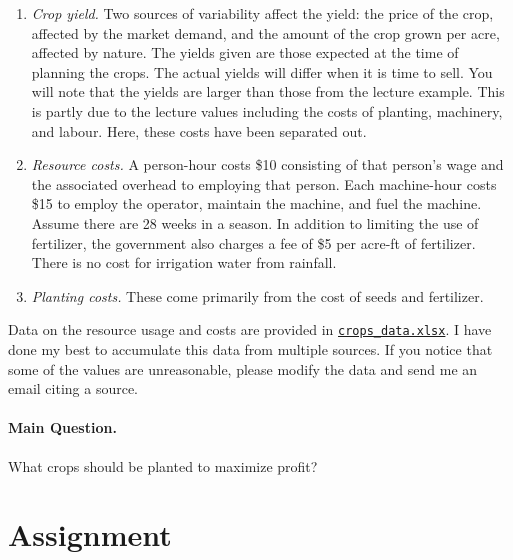 \documentclass[letter]{article}
\begin{document}
\begin{enumerate}	
	
	\item \textit{Crop yield.} Two sources of variability affect the yield: the price of the crop, affected by the market demand, and the amount of the crop grown per acre, affected by nature. The yields given are those expected at the time of planning the crops. The actual yields will differ when it is time to sell. You will note that the yields are larger than those from the lecture example. This is partly due to the lecture values including the costs of planting, machinery, and labour. Here, these costs have been separated out.
	
	\item \textit{Resource costs.} A person-hour costs \$10 consisting of that person's wage and the associated overhead to employing that person. Each machine-hour costs \$15 to employ the operator, maintain the machine, and fuel the machine. Assume there are 28 weeks in a season. In addition to limiting the use of fertilizer, the government also charges a fee of \$5 per acre-ft of fertilizer. There is no cost for irrigation water from rainfall.	


	\item \textit{Planting costs.} These come primarily from the cost of seeds and fertilizer.
	
\end{enumerate}


Data on the resource usage and costs are provided in \href{https://raw.githubusercontent.com/bigfatbernie/IBLMathModeling/main/homeworks/homework2/crops_data.xlsx}{\tt crops\_data.xlsx}. I have done my best to accumulate this data from multiple sources. If you notice that some of the values are unreasonable, please modify the data and send me an email citing a source.

\paragraph{Main Question.} What crops should be planted to maximize profit?






\section{Assignment}
\end{document}
